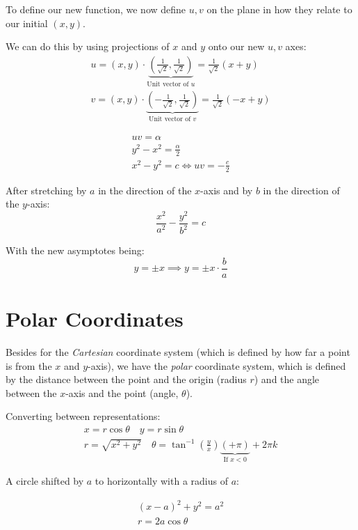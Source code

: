 \documentclass[00_complete]{subfiles}
\begin{document}
To define our new function, we now define ${u,v}$ on the plane in how they
relate to our initial $(x,y)$.

We can do this by using projections of $x$ and $y$ onto our new $u, v$ axes:
$$
\begin{gathered}
    u = (x,y) \cdot \underbrace{\left( \frac{1}{\sqrt 2}, \frac{1}{\sqrt 2}\right)}_{\text{Unit vector of $u$}} = \frac{1}{\sqrt 2}( x+y) \\
    v = (x,y) \cdot \underbrace{\left(-\frac{1}{\sqrt 2}, \frac{1}{\sqrt 2}\right)}_{\text{Unit vector of $v$}} = \frac{1}{\sqrt 2}(-x+y)
\end{gathered}
$$

\begin{conclusion}
$$
\begin{gathered}
    uv = \alpha \\
    y^2 - x^2 = \frac{\alpha}{2} \\
    x^2 - y^2 = c \iff uv = -\frac{c}{2}
\end{gathered}
$$
\end{conclusion}

After stretching by $a$ in the direction of the $x$-axis and by $b$ in the
direction of the $y$-axis:
$$\frac{x^2}{a^2} - \frac{y^2}{b^2} = c$$

With the new asymptotes being:
$$y=\pm x \implies y=\pm x \cdot \frac{b}{a}$$

\section{Polar Coordinates}

Besides for the \emph{Cartesian} coordinate system (which is defined by how far a
point is from the $x$ and $y$-axis), we have the \emph{polar} coordinate system,
which is defined by the distance between the point and the origin (radius $r$) and
the angle between the $x$-axis and the point (angle, $\theta$).

Converting between representations:
$$
\begin{gathered}
  x = r \cos \theta \quad y = r \sin \theta \\
  r = \sqrt{x^2+y^2} \quad \theta = \tan^{-1}\left(\frac{y}{x}\right)\underbrace{(+ \pi)}_{\text{If $x<0$}} +2 \pi k
\end{gathered}
$$

A circle shifted by $a$ to horizontally with a radius of $a$:

$$
\begin{gathered}
    (x-a)^2+y^2=a^2 \\
    r = 2a \cos \theta
\end{gathered}
$$
\end{document}
